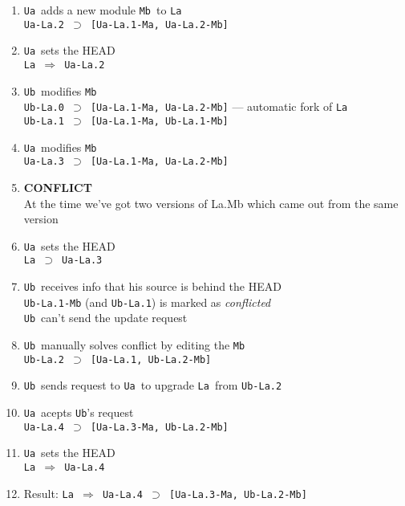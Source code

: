 \documentclass[10pt]{article}
\def\Ua{{\tt Ua}}
\def\Ub{{\tt Ub}}
\def\La{{\tt La}}
\def\Mb{{\tt Mb}}
\def\headsto{${\Longrightarrow}$ }
\def\hto{\headsto}
\def\eq{${\supset}$ }
\begin{document}
		\begin{enumerate}
			\item{\Ua\ adds a new module \Mb\ to \La\\
            		{\tt Ua-La.2 \eq [Ua-La.1-Ma, Ua-La.2-Mb]}
			}
			\item{\Ua\ sets the HEAD\\
				{\tt La \hto Ua-La.2}
			}
			\item{\Ub\ modifies \Mb\\
				{\tt Ub-La.0 \eq [Ua-La.1-Ma, Ua-La.2-Mb]} --- automatic fork of \La\\
				{\tt Ub-La.1 \eq [Ua-La.1-Ma, Ub-La.1-Mb]}
			}
			\item{\Ua\ modifies \Mb\\
				{\tt Ua-La.3 \eq [Ua-La.1-Ma, Ua-La.2-Mb]}
			}
			\item{{\bf CONFLICT}\\
            		At the time we've got two versions of La.Mb which came out from the same version
            	}
            	\item{\Ua\ sets the HEAD\\
            		{\tt La \eq Ua-La.3}
            	}
            	\item{\Ub\ receives info that his source is behind the HEAD\\
				{\tt Ub-La.1-Mb} (and {\tt Ub-La.1}) is marked as {\em conflicted}\\
				\Ub\ can't send the update request
			}
			\item{\Ub\ manually solves conflict by editing the \Mb\\
				{\tt Ub-La.2 \eq [Ua-La.1, Ub-La.2-Mb]}
			}
			\item{\Ub\ sends request to \Ua\ to upgrade \La\ from {\tt Ub-La.2}}
			\item{\Ua\ acepts \Ub's request\\
				{\tt Ua-La.4 \eq [Ua-La.3-Ma, Ub-La.2-Mb]}
			}
			\item{\Ua\ sets the HEAD\\
				{\tt La \hto Ua-La.4}
			}
			\item{Result: {\tt La \hto Ua-La.4 \eq [Ua-La.3-Ma, Ub-La.2-Mb]}}
		\end{enumerate}
		
	\
\end{document}
